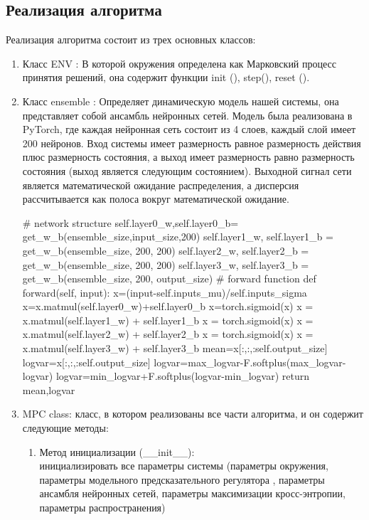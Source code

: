 \documentclass[a4paper,12pt]{article}
\begin{document}
\subsection{Реализация алгоритма}
Реализация алгоритма состоит из трех основных классов:
\begin{enumerate}
    \item Класс ENV :
В которой окружения определена как Марковский процесс принятия решений, она содержит функции init (), step(), reset ().
\item Класс ensemble :
Определяет динамическую модель нашей системы, она представляет собой ансамбль нейронных сетей.
Модель была реализована в PyTorch, где каждая нейронная сеть состоит из 4 слоев, каждый слой имеет 200 нейронов. Вход системы имеет размерность равное размерность действия плюс размерность состояния, а выход имеет размерность равно размерность состояния (выход является следующим состоянием). Выходной сигнал сети является математической ожидание распределения, а дисперсия рассчитывается как полоса вокруг математической ожидание.
\begin{python}
# network structure
self.layer0_w,self.layer0_b=
        get_w_b(ensemble_size,input_size,200)
self.layer1_w, self.layer1_b = 
        get_w_b(ensemble_size, 200, 200)
self.layer2_w, self.layer2_b = 
        get_w_b(ensemble_size, 200, 200)
self.layer3_w, self.layer3_b = 
        get_w_b(ensemble_size, 200, output_size)
# forward function
def forward(self, input):
    x=(input-self.inputs_mu)/self.inputs_sigma
    x=x.matmul(self.layer0_w)+self.layer0_b
    x=torch.sigmoid(x)
    x = x.matmul(self.layer1_w) + self.layer1_b
    x = torch.sigmoid(x)
    x = x.matmul(self.layer2_w) + self.layer2_b
    x = torch.sigmoid(x)
    x = x.matmul(self.layer3_w) + self.layer3_b
    mean=x[:,:,:self.output_size]
    logvar=x[:,:,:self.output_size]
    logvar=max_logvar-F.softplus(max_logvar-logvar)
    logvar=min_logvar+F.softplus(logvar-min_logvar)
    return mean,logvar
\end{python}
\item MPC class: класс, в котором реализованы все части алгоритма, и он содержит следующие методы:
\begin{enumerate}
    \item Метод инициализации (\_\_init\_\_):\\
инициализировать все параметры системы (параметры окружения, параметры модельного предсказательного регулятора , параметры ансамбля нейронных сетей, параметры максимизации кросс-энтропии, параметры распространения)
\begin{python}

\end{python}
\end{enumerate}
\end{enumerate}
\end{document}
